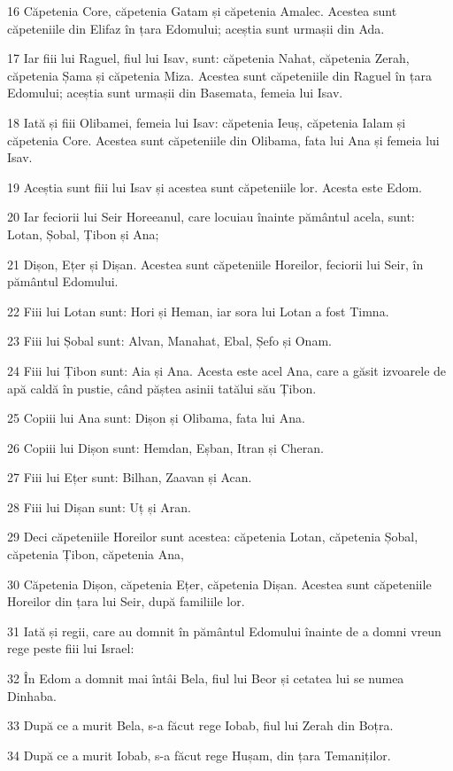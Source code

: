 \par 16 Căpetenia Core, căpetenia Gatam și căpetenia Amalec. Acestea sunt căpeteniile din Elifaz în țara Edomului; aceștia sunt urmașii din Ada.
\par 17 Iar fiii lui Raguel, fiul lui Isav, sunt: căpetenia Nahat, căpetenia Zerah, căpetenia Șama și căpetenia Miza. Acestea sunt căpeteniile din Raguel în țara Edomului; aceștia sunt urmașii din Basemata, femeia lui Isav.
\par 18 Iată și fiii Olibamei, femeia lui Isav: căpetenia Ieuș, căpetenia Ialam și căpetenia Core. Acestea sunt căpeteniile din Olibama, fata lui Ana și femeia lui Isav.
\par 19 Aceștia sunt fiii lui Isav și acestea sunt căpeteniile lor. Acesta este Edom.
\par 20 Iar feciorii lui Seir Horeeanul, care locuiau înainte pământul acela, sunt: Lotan, Șobal, Țibon și Ana;
\par 21 Dișon, Ețer și Dișan. Acestea sunt căpeteniile Horeilor, feciorii lui Seir, în pământul Edomului.
\par 22 Fiii lui Lotan sunt: Hori și Heman, iar sora lui Lotan a fost Timna.
\par 23 Fiii lui Șobal sunt: Alvan, Manahat, Ebal, Șefo și Onam.
\par 24 Fiii lui Țibon sunt: Aia și Ana. Acesta este acel Ana, care a găsit izvoarele de apă caldă în pustie, când păștea asinii tatălui său Țibon.
\par 25 Copiii lui Ana sunt: Dișon și Olibama, fata lui Ana.
\par 26 Copiii lui Dișon sunt: Hemdan, Eșban, Itran și Cheran.
\par 27 Fiii lui Ețer sunt: Bilhan, Zaavan și Acan.
\par 28 Fiii lui Dișan sunt: Uț și Aran.
\par 29 Deci căpeteniile Horeilor sunt acestea: căpetenia Lotan, căpetenia Șobal, căpetenia Țibon, căpetenia Ana,
\par 30 Căpetenia Dișon, căpetenia Ețer, căpetenia Dișan. Acestea sunt căpeteniile Horeilor din țara lui Seir, după familiile lor.
\par 31 Iată și regii, care au domnit în pământul Edomului înainte de a domni vreun rege peste fiii lui Israel:
\par 32 În Edom a domnit mai întâi Bela, fiul lui Beor și cetatea lui se numea Dinhaba.
\par 33 După ce a murit Bela, s-a făcut rege Iobab, fiul lui Zerah din Boțra.
\par 34 După ce a murit Iobab, s-a făcut rege Hușam, din țara Temaniților.
